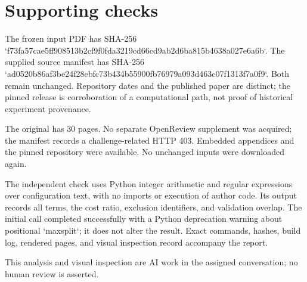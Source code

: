 \documentclass[10pt]{article}
\begin{document}
\section*{Supporting checks}
The frozen input PDF has SHA-256 `f73fa57cae5ff908513b2cf9f0fda3219cd66cd9ab2d6ba815b4638a027e6a6b`. The supplied source manifest has SHA-256 `ad0520b86af3be24f28ebfc73b434b55900fb76979a093d463c07f1313f7a0f9`. Both remain unchanged. Repository dates and the published paper are distinct; the pinned release is corroboration of a computational path, not proof of historical experiment provenance.\par
The original has 30 pages. No separate OpenReview supplement was acquired; the manifest records a challenge-related HTTP 403. Embedded appendices and the pinned repository were available. No unchanged inputs were downloaded again.\par
The independent check uses Python integer arithmetic and regular expressions over configuration text, with no imports or execution of author code. Its output records all terms, the cost ratio, exclusion identifiers, and validation overlap. The initial call completed successfully with a Python deprecation warning about positional `maxsplit`; it does not alter the result. Exact commands, hashes, build log, rendered pages, and visual inspection record accompany the report.\par
This analysis and visual inspection are AI work in the assigned conversation; no human review is asserted.\par
\end{document}

